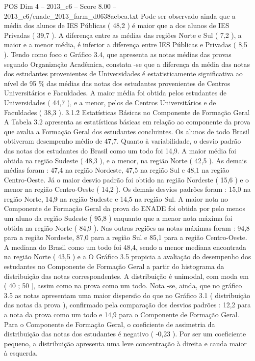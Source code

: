 \begin{textsample}{POS Dim 4 – 2013\_c6 – Score 8.00 – 2013\_c6/enade\_2013\_farm\_d0638aebea.txt}
Pode ser observado ainda que a média dos alunos de IES Públicas ( 48,2 ) é maior que a dos alunos de IES Privadas ( 39,7 ).
A diferença entre as médias das regiões Norte e Sul ( 7,2 ), a maior e a menor média, é inferior a diferença entre IES Públicas e Privadas ( 8,5 ).
Tendo como foco o Gráfico 3.4, que apresenta as notas médias das provas segundo Organização Acadêmica, constata -se que a diferença da média das notas dos estudantes provenientes de Universidades é estatisticamente significativa ao nível de 95 \% das médias das notas dos estudantes provenientes de Centros Universitários e Faculdades.
A maior média foi obtida pelos estudantes de Universidades ( 44,7 ), e a menor, pelos de Centros Universitários e de Faculdades ( 38,3 ). 3.1.2 Estatísticas Básicas no Componente de Formação Geral A Tabela 3.2 apresenta as estatísticas básicas em relação ao componente da prova que avalia a Formação Geral dos estudantes concluintes.
Os alunos de todo Brasil obtiveram desempenho médio de 47,7.
Quanto à variabilidade, o desvio padrão das notas dos estudantes do Brasil como um todo foi 14,9.
A maior média foi obtida na região Sudeste ( 48,3 ), e a menor, na região Norte ( 42,5 ).
As demais médias foram : 47,4 na região Nordeste, 47,5 na região Sul e 48,1 na região Centro-Oeste.
Já o maior desvio padrão foi obtido na região Nordeste ( 15,6 ) e o menor na região Centro-Oeste ( 14,2 ).
Os demais desvios padrões foram : 15,0 na região Norte, 14,9 na região Sudeste e 14,5 na região Sul.
A maior nota no Componente de Formação Geral da prova do ENADE foi obtida por pelo menos um aluno da região Sudeste ( 95,8 ) enquanto que a menor nota máxima foi obtida na região Norte ( 84,9 ).
Nas outras regiões as notas máximas foram : 94,8 para a região Nordeste, 87,0 para a região Sul e 85,1 para a região Centro-Oeste.
A mediana do Brasil como um todo foi 48,4, sendo a menor mediana encontrada na região Norte ( 43,5 ) e a O Gráfico 3.5 propicia a avaliação do desempenho dos estudantes no Componente de Formação Geral a partir do histograma da distribuição das notas correspondentes.
A distribuição é unimodal, com moda em ( 40 ; 50 ], assim como na prova como um todo.
Nota -se, ainda, que no gráfico 3.5 as notas apresentam uma maior dispersão do que no Gráfico 3.1 ( distribuição das notas da prova ), confirmado pela comparação dos desvios padrões : 12,2 para a nota da prova como um todo e 14,9 para o Componente de Formação Geral.
Para o Componente de Formação Geral, o coeficiente de assimetria da distribuição das notas dos estudantes é negativo ( -0,23 ).
Por ser um coeficiente pequeno, a distribuição apresenta uma leve concentração à direita e cauda maior à esquerda.

\end{textsample}
